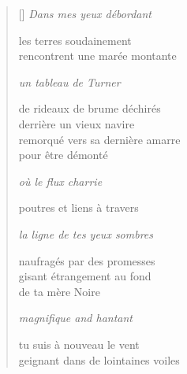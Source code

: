 \documentclass[12pt,a4paper]{article}
\begin{document}
\begin{verse}[\versewidth]
  \emph{Dans mes yeux débordant}

  les terres soudainement \\
  rencontrent une marée montante

  \emph{un tableau de Turner}

  de rideaux de brume déchirés \\
  derrière un vieux navire \\
  remorqué vers sa dernière amarre \\
  pour être démonté

  \emph{où le flux charrie}

  poutres et liens à travers

  \emph{la ligne de tes yeux sombres}

  naufragés par des promesses \\
  gisant étrangement au fond \\
  de ta mère Noire

  \emph{magnifique and hantant}

  tu suis à nouveau le vent \\
  geignant dans de lointaines voiles
\end{verse}


\newpage

\poemtitle{}

\settowidth{\versewidth}{Vous ne pouvez que ressentir et je vois}

\bigskip
\end{document}
